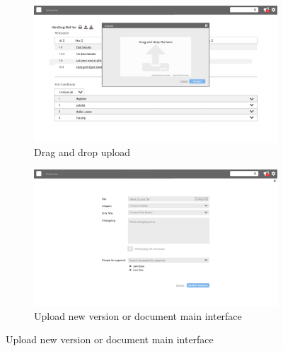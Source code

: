 \begin{figure}[H]
	\centering
	\begin{subfigure}[b]{0.48\textwidth}
		\includegraphics[width=\textwidth]{billeder/iteration3Prototyper/Page_8.jpg}
		\caption{Drag and drop upload}
		\label{fig:5-Upload1}
	\end{subfigure}
	\quad
	\begin{subfigure}[b]{0.48\textwidth}
		\includegraphics[width=\textwidth]{billeder/iteration3Prototyper/Page_9.jpg}
		\caption{Upload new version or document main interface}
		\label{fig:5-Upload2}
	\end{subfigure}
\end{figure}
